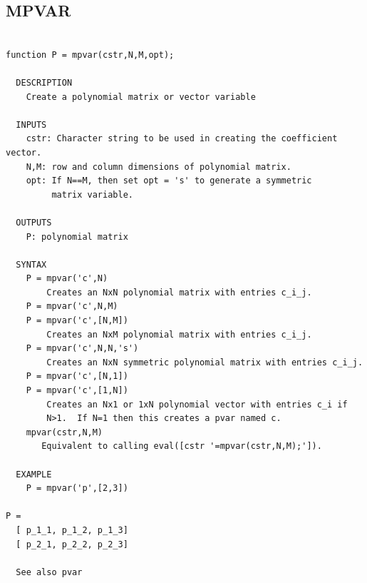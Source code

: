\documentclass{article}
\begin{document}
\newpage
\subsection{MPVAR}
\begin{verbatim}

function P = mpvar(cstr,N,M,opt);

  DESCRIPTION
    Create a polynomial matrix or vector variable

  INPUTS
    cstr: Character string to be used in creating the coefficient vector.
    N,M: row and column dimensions of polynomial matrix.
    opt: If N==M, then set opt = 's' to generate a symmetric
         matrix variable.

  OUTPUTS
    P: polynomial matrix

  SYNTAX
    P = mpvar('c',N)
        Creates an NxN polynomial matrix with entries c_i_j.
    P = mpvar('c',N,M)
    P = mpvar('c',[N,M])
        Creates an NxM polynomial matrix with entries c_i_j.
    P = mpvar('c',N,N,'s')
        Creates an NxN symmetric polynomial matrix with entries c_i_j.
    P = mpvar('c',[N,1])
    P = mpvar('c',[1,N])
        Creates an Nx1 or 1xN polynomial vector with entries c_i if
        N>1.  If N=1 then this creates a pvar named c.
    mpvar(cstr,N,M)
       Equivalent to calling eval([cstr '=mpvar(cstr,N,M);']).

  EXAMPLE
    P = mpvar('p',[2,3])

P =
  [ p_1_1, p_1_2, p_1_3]
  [ p_2_1, p_2_2, p_2_3]

  See also pvar


\end{verbatim}

\newpage
\end{document}
